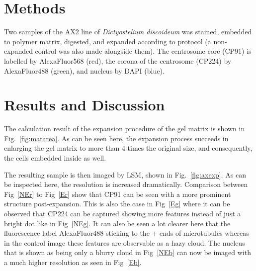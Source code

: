 \section{Methods}

Two samples of the AX2 line of \textit{Dictyostelium discoideum} was stained, embedded to polymer matrix, digested, and expanded according to protocol (a non-expanded control was also made alongside them).  
The centrosome core (CP91) is labelled by AlexaFluor568 (red), the corona of the centrosome (CP224) by AlexaFluor488 (green), and nucleus by DAPI (blue).

\section{Results and Discussion}

The calculation result of the expansion procedure of the gel matrix is shown in Fig.~\ref{fig:matarea}. 
As can be seen here, the expansion process succeeds in enlarging the gel matrix to more than 4 times the original size, and consequently, the cells embedded inside as well.  

The resulting sample is then imaged by LSM, shown in Fig.~\ref{fig:axexp}. 
As can be inspected here, the resolution is increased dramatically. 
Comparison between Fig~\ref{NEr} to Fig~\ref{Er} show that CP91 can be seen with a more prominent structure post-expansion. 
This is also the case in Fig~\ref{Eg} where it can be observed that CP224 can be captured showing more features instead of just a bright dot like in Fig~\ref{NEg}. 
It can also be seen a lot clearer here that the fluorescence label AlexaFluor488 sticking to the $+$ ends of microtubules whereas in the control image these features are observable as a hazy cloud. 
The nucleus that is shown as being only a blurry cloud in Fig~\ref{NEb} can now be imaged with a much higher resolution as seen in Fig~\ref{Eb}.

